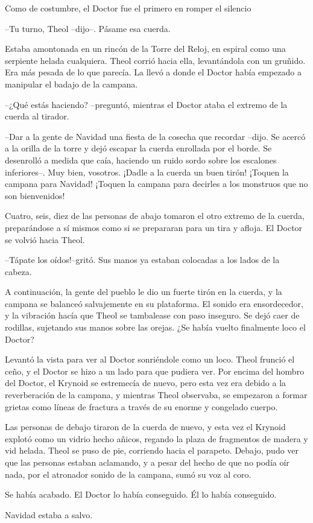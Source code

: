 Como de costumbre, el Doctor fue el primero en romper el silencio 

--Tu turno, Theol --dijo--. Pásame esa cuerda.



Estaba amontonada en un rincón de la Torre del Reloj, en espiral como una serpiente helada cualquiera. Theol corrió hacia ella, levantándola con un gruñido. Era más pesada de lo que parecía. La llevó a donde el Doctor había empezado a manipular el badajo de la campana.



--¿Qué estás haciendo? --preguntó, mientras el Doctor ataba el extremo de la cuerda al tirador.


--Dar a la gente de Navidad una fiesta de la cosecha que recordar --dijo. Se acercó a la orilla de la torre y dejó escapar la cuerda enrollada por el borde. Se desenrolló a medida que caía, haciendo un ruido sordo sobre los escalones inferiores--. Muy bien, vosotros. ¡Dadle a la cuerda un buen tirón! ¡Toquen la campana para Navidad! ¡Toquen la campana para decirles a los monstruos que no son bienvenidos!



Cuatro, seis, diez de las personas de abajo tomaron el otro extremo de la cuerda, preparándose a sí mismos como si se prepararan para un tira y afloja. El Doctor se volvió hacia Theol. 

--Tápate los oídos!--gritó. Sus manos ya estaban colocadas a los lados de la cabeza.



A continuación, la gente del pueblo le dio un fuerte tirón en la cuerda, y la campana se balanceó salvajemente en su plataforma. El sonido era ensordecedor, y la vibración hacía que Theol se tambalease con paso inseguro. Se dejó caer de rodillas, sujetando sus manos sobre las orejas. ¿Se había vuelto finalmente loco el Doctor?



Levantó la vista para ver al Doctor sonriéndole como un loco. Theol frunció el ceño, y el Doctor se hizo a un lado para que pudiera ver. Por encima del hombro del Doctor, el Krynoid se estremecía de nuevo, pero esta vez era debido a la reverberación de la campana, y mientras Theol observaba, se empezaron a formar grietas como líneas de fractura a través de su enorme y congelado cuerpo.



Las personas de debajo tiraron de la cuerda de nuevo, y esta vez el Krynoid explotó como un vidrio hecho añicos, regando la plaza de fragmentos de madera y vid helada. Theol se puso de pie, corriendo hacia el parapeto. Debajo, pudo ver que las personas estaban aclamando, y a pesar del hecho de que no podía oír nada, por el atronador sonido de la campana, sumó su voz al coro.



Se había acabado. El Doctor lo había conseguido. Él lo había conseguido.



Navidad estaba a salvo.
